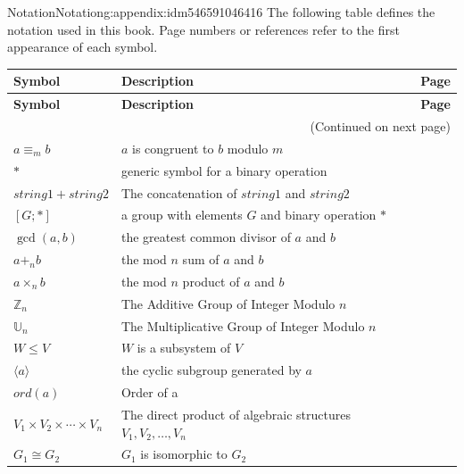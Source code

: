 \documentclass[oneside,10pt,]{book}
\numberwithin{equation}{section}
\begin{document}
\begin{appendixptx}{Notation}{}{Notation}{}{}{g:appendix:idm546591046416}
The following table defines the notation used in this book. Page numbers or references refer to the first appearance of each symbol.%
\begin{longtable}[l]{lp{}r}
\addtocounter{table}{-1}
\textbf{Symbol}&\textbf{Description}&\textbf{Page}\\[1em]
\endfirsthead
\textbf{Symbol}&\textbf{Description}&\textbf{Page}\\[1em]
\endhead
\multicolumn{3}{r}{(Continued on next page)}\\
\endfoot
\endlastfoot
\(a \equiv_m b\)&\(a\) is congruent to \(b\) modulo \(m\)&\pageref{g:notation:idm546600770928}\\
\(*\)&generic symbol for a binary operation&\pageref{g:notation:idm546601807488}\\
\(string1 + string2\)&The concatenation of \(string1\) and \(string2\)&\pageref{g:notation:idm546599749232}\\
\([G;*]\)&a group with elements \(G\) and binary operation \(*\)&\pageref{g:notation:idm546617800048}\\
\(\gcd(a,b)\)&the greatest common divisor of \(a\) and \(b\)&\pageref{g:notation:idm546602307520}\\
\(a +_n b\)&the mod \(n\) sum of \(a\) and \(b\)&\pageref{g:notation:idm546602219424}\\
\(a \times_n b\)&the mod \(n\) product of \(a\) and \(b\)&\pageref{g:notation:idm546602214368}\\
\(\mathbb{Z}_n\)&The Additive Group of Integer Modulo \(n\)&\pageref{g:notation:idm546602195008}\\
\(\mathbb{U}_n\)&The Multiplicative Group of Integer Modulo \(n\)&\pageref{g:notation:idm546602186016}\\
\(W \leq  V\)&\(W\) is a subsystem of \(V\)&\pageref{g:notation:idm546595797216}\\
\(\langle a \rangle\)&the cyclic subgroup generated by \(a\)&\pageref{g:notation:idm546595696624}\\
\(ord(a)\)&Order of a&\pageref{g:notation:idm546595684112}\\
\(V_1\times V_2 \times \cdots \times V_n\)&The direct product of algebraic structures \(V_1,  V_2, \dots , V_n \)&\pageref{g:notation:idm546595593440}\\
\(G_1 \cong G_2\)&\(G_1\) is isomorphic to \(G_2\)&\pageref{g:notation:idm546595399696}\\

\end{longtable}
\end{appendixptx}
\end{document}
